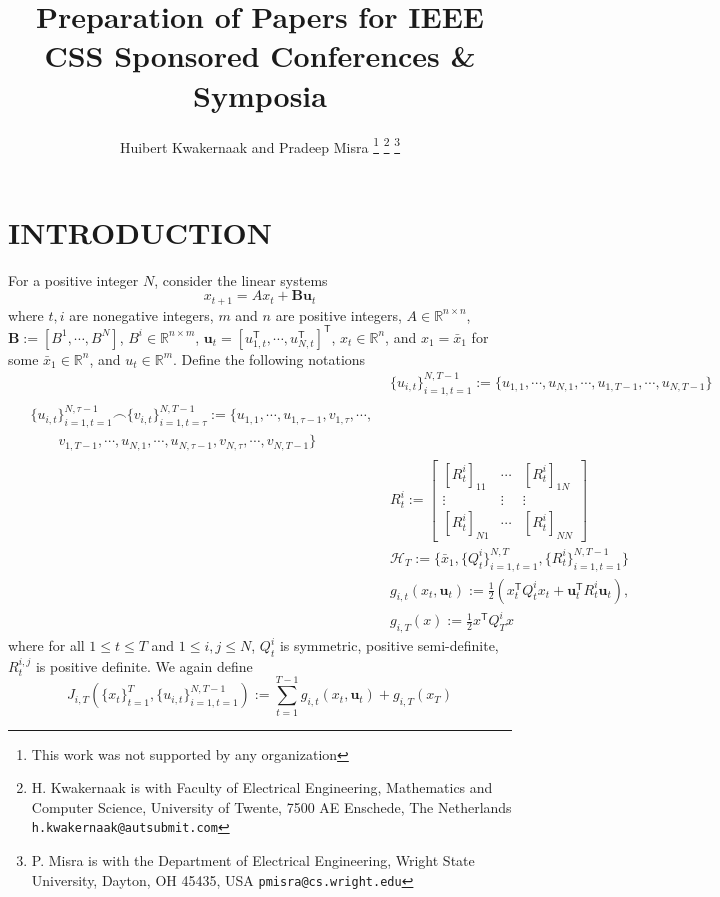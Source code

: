\documentclass[letterpaper, 10 pt, conference]{ieeeconf}  %
\title{\LARGE \bf
Preparation of Papers for IEEE CSS Sponsored Conferences \& Symposia
}
\author{Huibert Kwakernaak and Pradeep Misra%
\thanks{This work was not supported by any organization}%
\thanks{H. Kwakernaak is with Faculty of Electrical Engineering, Mathematics and Computer Science,
        University of Twente, 7500 AE Enschede, The Netherlands
        {\tt\small h.kwakernaak@autsubmit.com}}%
\thanks{P. Misra is with the Department of Electrical Engineering, Wright State University,
        Dayton, OH 45435, USA
        {\tt\small pmisra@cs.wright.edu}}%
}
\newcommand{\transpose}{\mathsf{T}}
\begin{document}
\maketitle
\thispagestyle{empty}
\pagestyle{empty}


\begin{abstract}

\end{abstract}


\section{INTRODUCTION}
For a positive integer $N$, consider the linear systems
\begin{equation}\label{eq:linsys}
    x_{t+1} = Ax_{t} + \mathbf{B}\mathbf{u}_{t}
\end{equation}
where $t,i$ are nonegative integers, $m$ and $n$ are positive integers, $A \in \mathbb{R}^{n\times n}$, $\mathbf{B} := [B^{1},\cdots, B^{N}]$, $B^{i} \in \mathbb{R}^{n\times m}$, $\mathbf{u}_{t} = [u_{1,t}^{\transpose},\cdots,u_{N,t}^{\transpose}]^{\transpose}$, $x_t\in\mathbb{R}^n$, and $x_{1} =\bar{x}_{1}$ for some $\bar{x}_1 \in \mathbb{R}^{n}$, and $u_{t} \in \mathbb{R}^{m}$.
Define the following notations
\begin{align}
    &\{u_{i,t}\}_{i=1,t=1}^{N,T-1} := \{u_{1,1},\cdots,u_{N,1},\cdots, u_{1,T-1},\cdots,u_{N,T-1}\}\\
    \begin{split}
         &\{u_{i,t}\}_{i=1,t=1}^{N,\tau-1} \frown \{v_{i,t}\}_{i=1,t=\tau}^{N,T-1}:=\{u_{1,1},\cdots,u_{1,\tau-1},v_{1,\tau},\cdots,\\
    &\qquad v_{1,T-1},\cdots,u_{N,1},\cdots,u_{N,\tau-1},v_{N,\tau},\cdots,v_{N,T-1} \}
    \end{split}
   \\ 
   & R_{t}^{i} := 
   \begin{bmatrix}
       [R_{t}^{i}]_{11} & \cdots & [R_{t}^{i}]_{1N}\\
       \vdots & \vdots & \vdots\\
       [R_{t}^{i}]_{N1} & \cdots & [R_{t}^{i}]_{NN}
   \end{bmatrix}\\
    \label{eq:history}
    &\mathcal{H}_{T} := \{ \bar{x}_{1},\{Q_{t}^{i}\}_{i=1,t=1}^{N,T},\{R_{t}^{i}\}_{i=1,t=1}^{N,T-1}\}\\
    &g_{i,t}(x_{t}, \mathbf{u}_{t}) := \frac{1}{2}(x_{t}^{\mathsf{T}}Q_{t}^{i}x_{t} + 
    \mathbf{u}_{t}^{\transpose}R_{t}^{i}\mathbf{u}_{t}),\\
    &g_{i,T}(x) := \frac{1}{2} x^{\mathsf{T}}Q_{T}^{i}x
\end{align}
where for all $1 \leq t \leq T$ and $1\leq i,j\leq N$, $Q_{t}^{i}$ is symmetric, positive semi-definite, $R_{t}^{i,j}$ is positive definite. We again define
\begin{equation}
    J_{i,T}(\{x_{t}\}_{t=1}^{T},\{u_{i,t}\}_{i=1,t=1}^{N,T-1}) := \sum_{t=1}^{T-1} g_{i,t}(x_{t}, \mathbf{u}_{t}) + g_{i,T}(x_{T})
\end{equation}
\end{document}
